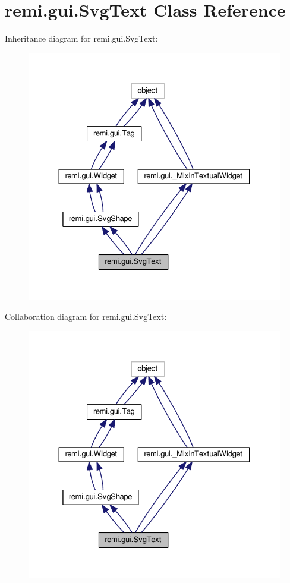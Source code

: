 \hypertarget{classremi_1_1gui_1_1SvgText}{}\section{remi.\+gui.\+Svg\+Text Class Reference}
\label{classremi_1_1gui_1_1SvgText}


Inheritance diagram for remi.\+gui.\+Svg\+Text\+:
\nopagebreak
\begin{figure}[H]
\begin{center}
\leavevmode
\includegraphics[width=330pt]{d7/d7c/classremi_1_1gui_1_1SvgText__inherit__graph}
\end{center}
\end{figure}


Collaboration diagram for remi.\+gui.\+Svg\+Text\+:
\nopagebreak
\begin{figure}[H]
\begin{center}
\leavevmode
\includegraphics[width=330pt]{d2/d46/classremi_1_1gui_1_1SvgText__coll__graph}
\end{center}
\end{figure}
